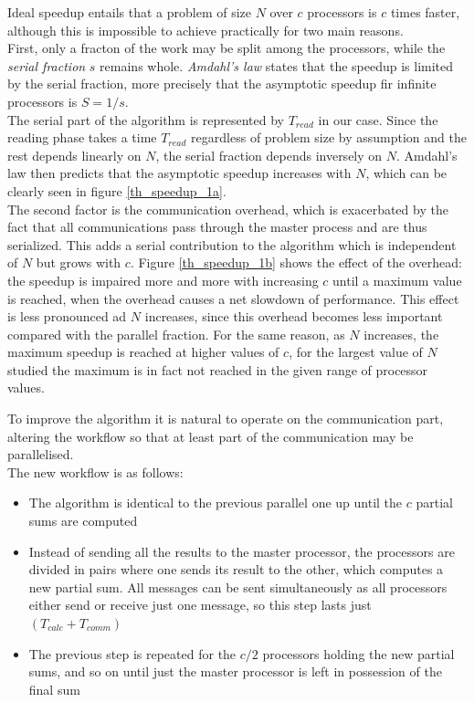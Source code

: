 \documentclass{article}
\begin{document}
Ideal speedup entails that a problem of size $N$ over $c$ processors is $c$ times faster, although this is impossible to achieve practically for two main reasons.\\
First, only a fracton of the work may be split among the processors, while the \textit{serial fraction} $s$ remains whole. \textit{Amdahl's law} states that the speedup is limited by the serial fraction, more precisely that the asymptotic speedup fir infinite processors is $S=1/s$.\\
The serial part of the algorithm is represented by $T_{read}$ in our case. Since the reading phase takes a time $T_{read}$ regardless of problem size by assumption and the rest depends linearly on $N$, the serial fraction depends inversely on $N$. Amdahl's law then predicts that the asymptotic speedup increases with $N$, which can be clearly seen in figure \ref{th_speedup_1a}.\\
The second factor is the communication overhead, which is exacerbated by the fact that all communications pass through the master process and are thus serialized. This adds a serial contribution to the algorithm which is independent of $N$ but grows with $c$. Figure \ref{th_speedup_1b} shows the effect of the overhead: the speedup is impaired more and more with increasing $c$ until a maximum value is reached, when the overhead causes a net slowdown of performance. This effect is less pronounced ad $N$ increases, since this overhead becomes less important compared with the parallel fraction. For the same reason, as $N$ increases, the maximum speedup is reached at higher values of $c$, for the largest value of $N$ studied the maximum is in fact not reached in the given range of processor values.

\par
To improve the algorithm it is natural to operate on the communication part, altering the workflow so that at least part of the communication may be parallelised.\\
The new workflow is as follows:


\begin{itemize}
\item The algorithm is identical to the previous parallel one up until the $c$ partial sums are computed
\item Instead of sending all the results to the master processor, the processors are divided in pairs where one sends its result to the other, which computes a new partial sum. All messages can be sent simultaneously as all processors either send or receive just one message, so this step lasts just $\left( T_{calc} + T_{comm} \right)$
\item The previous step is repeated for the $c/2$ processors holding the new partial sums, and so on until just the master processor is left in possession of the final sum
\end{itemize}
\end{document}
